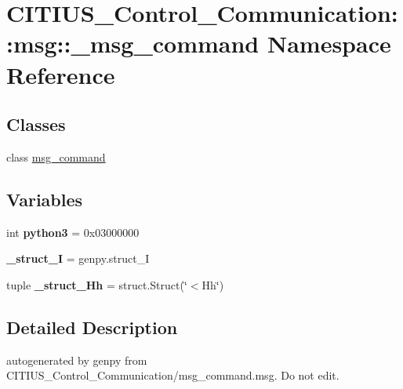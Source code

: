 \hypertarget{namespace_c_i_t_i_u_s___control___communication_1_1msg_1_1__msg__command}{\section{\-C\-I\-T\-I\-U\-S\-\_\-\-Control\-\_\-\-Communication\-:\-:msg\-:\-:\-\_\-msg\-\_\-command \-Namespace \-Reference}
\label{namespace_c_i_t_i_u_s___control___communication_1_1msg_1_1__msg__command}
}
\subsection*{\-Classes}
\begin{DoxyCompactItemize}
\item 
class \hyperlink{class_c_i_t_i_u_s___control___communication_1_1msg_1_1__msg__command_1_1msg__command}{msg\-\_\-command}
\end{DoxyCompactItemize}
\subsection*{\-Variables}
\begin{DoxyCompactItemize}
\item 
\hypertarget{namespace_c_i_t_i_u_s___control___communication_1_1msg_1_1__msg__command_a1febde22cbe01e1ad5a56ecab26c8e5d}{int {\bfseries python3} = 0x03000000}\label{namespace_c_i_t_i_u_s___control___communication_1_1msg_1_1__msg__command_a1febde22cbe01e1ad5a56ecab26c8e5d}

\item 
\hypertarget{namespace_c_i_t_i_u_s___control___communication_1_1msg_1_1__msg__command_a91dd5ce5d5f0f36001cb29b2548da21e}{{\bfseries \-\_\-struct\-\_\-\-I} = genpy.\-struct\-\_\-\-I}\label{namespace_c_i_t_i_u_s___control___communication_1_1msg_1_1__msg__command_a91dd5ce5d5f0f36001cb29b2548da21e}

\item 
\hypertarget{namespace_c_i_t_i_u_s___control___communication_1_1msg_1_1__msg__command_a8970d47906a8aef0053f7e9c3dd5bea9}{tuple {\bfseries \-\_\-struct\-\_\-\-Hh} = struct.\-Struct(\char`\"{}$<$\-Hh\char`\"{})}\label{namespace_c_i_t_i_u_s___control___communication_1_1msg_1_1__msg__command_a8970d47906a8aef0053f7e9c3dd5bea9}

\end{DoxyCompactItemize}


\subsection{\-Detailed \-Description}
\begin{DoxyVerb}autogenerated by genpy from CITIUS_Control_Communication/msg_command.msg. Do not edit.\end{DoxyVerb}
 